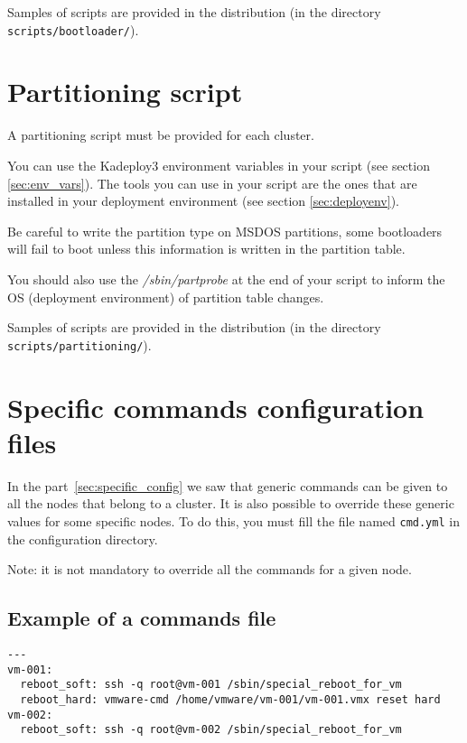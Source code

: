 \documentclass[a4wide,10pt,oneside]{book}
\begin{document}
Samples of scripts are provided in the distribution (in the directory \texttt{scripts/bootloader/}).

\section{Partitioning script}\label{sec:partscript}
A partitioning script must be provided for each cluster.

You can use the Kadeploy3 environment variables in your script (see section \ref{sec:env_vars}). The tools you can use in your script are the ones that are installed in your deployment environment (see section \ref{sec:deployenv}).

Be careful to write the partition type on MSDOS partitions, some bootloaders will fail to boot unless this information is written in the partition table.

You should also use the \emph{/sbin/partprobe} at the end of your script to inform the OS (deployment environment) of partition table changes.

Samples of scripts are provided in the distribution (in the directory \texttt{scripts/partitioning/}).

\section{Specific commands configuration files}
In the part~\ref{sec:specific_config} we saw that generic commands can be given to all the nodes that belong to a cluster. It is also possible to override these generic values for some specific nodes. To do this, you must fill the file named \texttt{cmd.yml} in the configuration directory.

Note: it is not mandatory to override all the commands for a given node.

\subsection{Example of a commands file\\}
\begin{small}
\begin{verbatim}
---
vm-001:
  reboot_soft: ssh -q root@vm-001 /sbin/special_reboot_for_vm
  reboot_hard: vmware-cmd /home/vmware/vm-001/vm-001.vmx reset hard
vm-002:
  reboot_soft: ssh -q root@vm-002 /sbin/special_reboot_for_vm
\end{verbatim}
\end{small}
\end{document}
